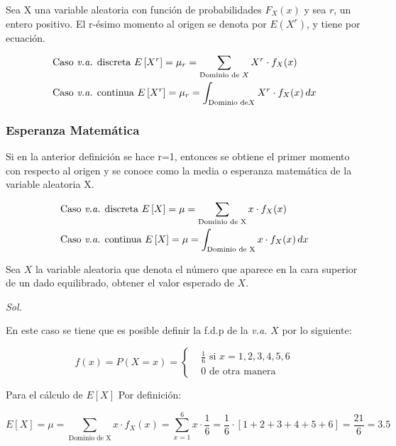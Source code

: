 Sea X una variable aleatoria con función de probabilidades $F_X(x)$ y sea $r$, un entero positivo. El r-ésimo momento al origen se denota por $E(X^r)$, y tiene por ecuación.

\begin{align}
     & \text{Caso \textit{v.a.} discreta }E\left[X^r\right]=\mu_r= \sum_{\text{Dominio de } X}X^r\cdot f_X(x)        \\
     & \text{Caso \textit{v.a.} continua } E\left[  X^r\right]=\mu_r= \int_{\text{Dominio de}  X}X^r\cdot f_X(x)\,dx
\end{align}


\subsubsection{Esperanza Matemática}
Si en la anterior definición se hace r=1, entonces se obtiene el primer momento con respecto al origen y se conoce como la media o esperanza matemática de la variable aleatoria X.

\begin{align}
     & \text{Caso \textit{v.a.} discreta }E\left[  X\right]=\mu = \sum_{\text{Dominio de X}}x\cdot f_X(x)      \\
     & \text{Caso \textit{v.a.} continua } E\left[  X\right]=\mu = \int_{\text{Dominio de X}}x\cdot f_X(x)\,dx
\end{align}

\begin{example}
    Sea $X$ la variable aleatoria que denota el
    número que aparece en la cara superior de un
    dado equilibrado, obtener el valor esperado de $X$.
\end{example}

\textit{ Sol. }

En este caso se tiene que es posible definir la f.d.p
de la \textit{v.a.} $X$ por lo siguiente:

\begin{equation*}
    f(x)=P(X=x)=\begin{cases}
         & \frac{1}{6}\text{ si } x=1,2,3,4,5,6 \\
         & 0\text{ de otra manera}
    \end{cases}
\end{equation*}

Para el cálculo de $E\left[  X\right]$ Por definición:

\begin{equation*}
    E\left[  X\right]=\mu = \sum_{\text{Dominio de X}}x\cdot f_X(x)=\sum_{ x=1}^6 x\cdot \frac{1}{6}=\frac{1}{6}\cdot \left[ 1+2+3+4+5+6\right]=\frac{21}{6}=3.5
\end{equation*}

